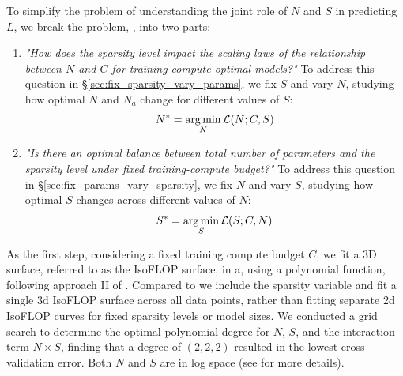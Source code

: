 To simplify the problem of understanding the joint role of \( N \) and \( S \) in predicting \( L \), we break the problem, , into two parts:
\begin{enumerate}[left=0pt,itemsep=2pt]
\item \textit{"How does the sparsity level impact the scaling laws of the relationship between \( N \) and \( C \) for training-compute optimal models?"}
To address this question in \S\ref{sec:fix_sparsity_vary_params}, we fix \( S \) and vary \( N \), studying how optimal \( N \) and \( N_a \) change for different values of \( S \):
\begin{equation}
    N^* = \operatorname*{arg\,min}_{N} \mathcal{L}(N; C, S)
\label{eq:fix_sparsity_vary_N}
\end{equation}
\item \textit{"Is there an optimal balance between total number of parameters and the sparsity level under fixed training-compute budget?"}
To address this question in \S\ref{sec:fix_params_vary_sparsity}, we fix \( N \) and vary \( S \), studying how optimal \( S \) changes across different values of \( N \):
\begin{equation}
    S^* = \operatorname*{arg\,min}_{S} \mathcal{L}(S; C, N)
\label{eq:fix_N_vary_sparsity}
\end{equation}
\end{enumerate}
As the first step, considering a fixed training compute budget \( C \), we fit a 3D surface, referred to as the IsoFLOP surface, in a, using a polynomial function, following approach II of \citet{hoffmann2022training}. 
Compared to \citet{hoffmann2022training} we include the sparsity variable and fit a single 3d IsoFLOP surface across all data points, rather than fitting separate 2d IsoFLOP curves for fixed sparsity levels or model sizes. 
We conducted a grid search to determine the optimal polynomial degree for \( N \), \( S \), and the interaction term \( N \times S \), finding that a degree of \( (2, 2, 2) \) resulted in the lowest cross-validation error. Both \( N \) and \( S \) are in log space (see  for more details).

